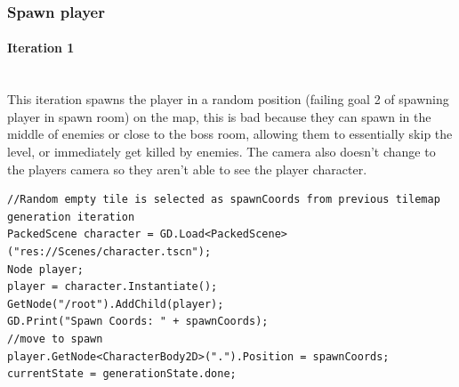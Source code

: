 \documentclass{article}
\newcommand{\myparagraph}[1]{\paragraph{#1}\mbox{}\\} %
\begin{document}
\subsubsection{Spawn player}
\myparagraph{Iteration 1}
This iteration spawns the player in a  random position (failing goal 2 of spawning player in spawn room) on the map, this is bad because they can spawn in the middle of enemies or close to the boss room, allowing them to essentially skip the level, or immediately get killed by enemies. The camera also doesn't change to the players camera so they aren't able to see the player character.
\begin{lstlisting}
//Random empty tile is selected as spawnCoords from previous tilemap generation iteration
PackedScene character = GD.Load<PackedScene>("res://Scenes/character.tscn");
Node player;
player = character.Instantiate();
GetNode("/root").AddChild(player);
GD.Print("Spawn Coords: " + spawnCoords);
//move to spawn
player.GetNode<CharacterBody2D>(".").Position = spawnCoords;
currentState = generationState.done;
\end{lstlisting}
\end{document}
